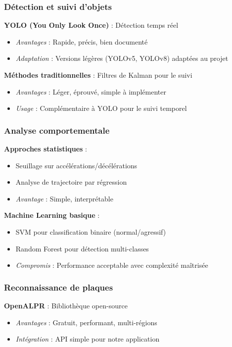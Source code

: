 \documentclass[12pt,a4paper]{article}
\begin{document}
\subsubsection{Détection et suivi d'objets}

\textbf{YOLO (You Only Look Once)} : Détection temps réel
\begin{itemize}
    \item \textit{Avantages} : Rapide, précis, bien documenté
    \item \textit{Adaptation} : Versions légères (YOLOv5, YOLOv8) adaptées au projet
\end{itemize}

\textbf{Méthodes traditionnelles} : Filtres de Kalman pour le suivi
\begin{itemize}
    \item \textit{Avantages} : Léger, éprouvé, simple à implémenter
    \item \textit{Usage} : Complémentaire à YOLO pour le suivi temporel
\end{itemize}

\subsubsection{Analyse comportementale}

\textbf{Approches statistiques} :
\begin{itemize}
    \item Seuillage sur accélérations/décélérations
    \item Analyse de trajectoire par régression
    \item \textit{Avantage} : Simple, interprétable
\end{itemize}

\textbf{Machine Learning basique} :
\begin{itemize}
    \item SVM pour classification binaire (normal/agressif)
    \item Random Forest pour détection multi-classes
    \item \textit{Compromis} : Performance acceptable avec complexité maîtrisée
\end{itemize}

\subsubsection{Reconnaissance de plaques}

\textbf{OpenALPR} : Bibliothèque open-source
\begin{itemize}
    \item \textit{Avantages} : Gratuit, performant, multi-régions
    \item \textit{Intégration} : API simple pour notre application
\end{itemize}
\end{document}

